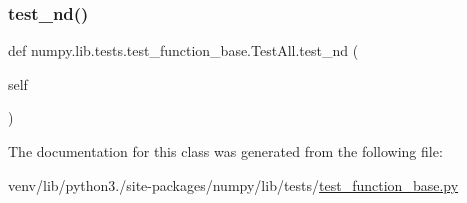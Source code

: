 \mbox{\label{classnumpy_1_1lib_1_1tests_1_1test__function__base_1_1TestAll_a50ed98e93b306f00c907009586dc58db}} 
\subsubsection{\texorpdfstring{test\+\_\+nd()}{test\_nd()}}
{\footnotesize\ttfamily def numpy.\+lib.\+tests.\+test\+\_\+function\+\_\+base.\+Test\+All.\+test\+\_\+nd (\begin{DoxyParamCaption}\item[{}]{self }\end{DoxyParamCaption})}



The documentation for this class was generated from the following file\+:\begin{DoxyCompactItemize}
\item 
venv/lib/python3./site-\/packages/numpy/lib/tests/\hyperlink{lib_2tests_2test__function__base_8py}{test\+\_\+function\+\_\+base.\+py}\end{DoxyCompactItemize}
